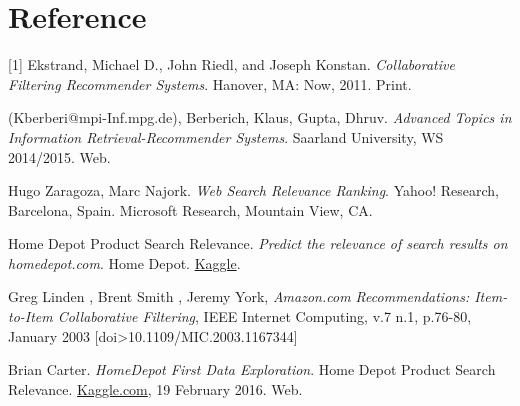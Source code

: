 \documentclass[11pt, titlepage]{article}
\begin{document}
\section*{Reference}
[1] Ekstrand, Michael D., John Riedl, and Joseph Konstan.\textit{ Collaborative Filtering Recommender Systems}. Hanover, MA: Now, 2011. Print.

\noindent 
[2] (Kberberi@mpi-Inf.mpg.de), Berberich, Klaus, Gupta, Dhruv. \textit{Advanced Topics in Information Retrieval-Recommender Systems}. Saarland University, WS 2014/2015. Web.

\noindent 
[3] Hugo Zaragoza, Marc Najork. \textit{Web Search Relevance Ranking}. Yahoo! Research, Barcelona, Spain. Microsoft Research, Mountain View, CA.

\noindent 
[4] Home Depot Product Search Relevance. \textit{Predict the relevance of search results on homedepot.com}. Home Depot. \href{<https://www.kaggle.com/c/home-depot-product-search-relevance>}{Kaggle}. 


\noindent 
[5] Greg Linden , Brent Smith , Jeremy York, \textit{Amazon.com Recommendations: Item-to-Item Collaborative Filtering}, IEEE Internet Computing, v.7 n.1, p.76-80, January 2003  [doi>10.1109/MIC.2003.1167344]

\noindent 
[6] Brian Carter. \textit{HomeDepot First Data Exploration}. Home Depot Product Search Relevance. \href{<https://www.kaggle.com/briantc/home-depot-product-search-relevance/homedepot-first-dataexploreation-k>}{Kaggle.com}, 19 February 2016. Web.
\end{document}
